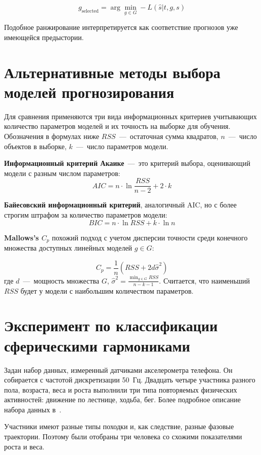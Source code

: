 \documentclass[article,14pt,subf,href,colorlinks=true
]{disser}
\begin{document}
\begin{equation*}
g_{\text{selected}} = \arg \min_{g \in G} -L(\hat{s}|t,g,s)
\end{equation*}

Подобное ранжирование интерпретируется как соответствие прогнозов уже имеющейся предыстории.

\newpage
\section{Альтернативные методы выбора моделей прогнозирования}

Для сравнения применяются три вида информационных критериев учитывающих количество параметров моделей и их точность на выборке для обучения.
Обозначения в формулах ниже $RSS$~---~остаточная сумма квадратов, $n$~---~число объектов в выборке, $k$~---~число параметров модели. 

\textbf{Информационный критерий Акаике}~---~это критерий выбора, оценивающий модели с разным числом параметров:
\[
AIC = n\cdot\ln{\frac{RSS}{n-2}} + 2\cdot k
\]

\textbf{Байесовский информационный критерий}, аналогичный AIC, но с более строгим штрафом за количество параметров модели:
\[
BIC = n\cdot\ln{RSS} + k\cdot\ln{n}
\]

\textbf{Mallows’s $C_p$} похожий подход с учетом дисперсии точности среди конечного множества доступных линейных моделей $g \in G$:

\[
C_p = \frac{1}{n}(RSS + 2d\hat{\sigma}^2)
\]
где $d$~---~мощность множества $G$, $\hat{\sigma}^2=\frac{\min_{g \in G}RSS}{n-k-1}$. Считается, что наименьший $RSS$ будет у модели с наибольшим количеством параметров.
\newpage
\section{Эксперимент по классификации сферическими гармониками}

Задан набор данных, измеренный датчиками акселерометра телефона.
Он собирается с частотой дискретизации 50~Гц.
Двадцать четыре участника разного пола, возраста, веса и роста выполнили три типа повторяемых физических активностей: движение по лестнице, ходьба, бег.
Более подробное описание набора данных в~\cite{Malekzadeh_2018}.

Участники имеют разные типы походки и, как следствие, разные фазовые траектории.
Поэтому были отобраны три человека со схожими показателями роста и веса.
\end{document}
